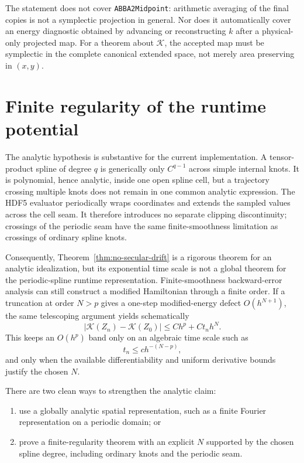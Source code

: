 \documentclass[11pt,a4paper]{article}
\theoremstyle{definition}
\theoremstyle{remark}
\newcommand{\K}{\mathcal{K}}
\newcommand{\abs}[1]{\left\lvert #1\right\rvert}
\begin{document}
The statement does not cover \texttt{ABBA2Midpoint}: arithmetic averaging of
the final copies is not a symplectic projection in general.  Nor does it
automatically cover an energy diagnostic obtained by advancing or
reconstructing $k$ after a physical-only projected map.  For a theorem about
$\K$, the accepted map must be symplectic in the complete canonical extended
space, not merely area preserving in $(x,y)$.

\section{Finite regularity of the runtime potential}

The analytic hypothesis is substantive for the current implementation.
A tensor-product spline of degree $q$ is generically only $C^{q-1}$ across
simple internal knots.  It is polynomial, hence analytic, inside one open
spline cell, but a trajectory crossing multiple knots does not remain in one
common analytic expression.  The HDF5 evaluator periodically wraps coordinates
and extends the sampled values across the cell seam.  It therefore introduces
no separate clipping discontinuity; crossings of the periodic seam have the
same finite-smoothness limitation as crossings of ordinary spline knots.

Consequently, Theorem~\ref{thm:no-secular-drift} is a rigorous theorem for an
analytic idealization, but its exponential time scale is not a global theorem
for the periodic-spline runtime representation.  Finite-smoothness
backward-error analysis can still construct a modified Hamiltonian through a
finite order.  If a truncation at order $N>p$ gives a one-step modified-energy
defect $O(h^{N+1})$, the same telescoping argument yields schematically
\begin{equation}
 \abs{\K(Z_n)-\K(Z_0)}
 \leq Ch^p+C t_nh^N.
 \label{eq:finite-smoothness-energy-bound}
\end{equation}
This keeps an $O(h^p)$ band only on an algebraic time scale such as
\begin{equation}
 t_n\leq c h^{-(N-p)},
 \label{eq:algebraic-time-scale}
\end{equation}
and only when the available differentiability and uniform derivative bounds
justify the chosen $N$.

There are two clean ways to strengthen the analytic claim:
\begin{enumerate}
 \item use a globally analytic spatial representation, such as a finite
       Fourier representation on a periodic domain; or
 \item prove a finite-regularity theorem with an explicit $N$ supported by the
       chosen spline degree, including ordinary knots and the periodic seam.
\end{enumerate}
\end{document}
